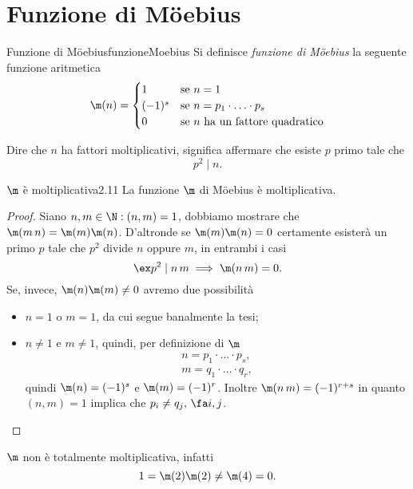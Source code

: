 \section{Funzione di M\"oebius}

\begin{defn}{Funzione di M\"oebius}{funzioneMoebius}
	Si definisce \emph{funzione di M\"oebius} la seguente funzione aritmetica
	\[
		\m(n)=
		\begin{cases}
			1      & \text{se }n=1                            \\
			(-1)^s & \text{se }n=p_1\cdot\ldots\cdot p_s      \\
			0      & \text{se \(n\) ha un fattore quadratico}
		\end{cases}
	\]
\end{defn}

\begin{oss}
	Dire che \(n\) ha fattori moltiplicativi, significa affermare che esiste \(p\) primo tale che
	\[
		p^2 \mid n.
	\]
\end{oss}

\begin{teor}{\(\m\) è moltiplicativa}{2.11}
	La funzione \(\m\) di M\"oebius è moltiplicativa.
\end{teor}

\begin{proof}
	Siano \(n,m \in \N:(n,m)=1\), dobbiamo mostrare che \(\m(m\,n)=\m(m) \m(n)\).
	D'altronde se \(\m(m)\m(n)=0\) certamente esisterà un primo \(p\) tale che \(p^2\) divide \(n\) oppure \(m\), in entrambi i casi
	\[
		\ex p^2 \mid n\,m \implies \m(n\,m)=0.
	\]
	Se, invece, \(\m(n)\m(m) \neq 0\) avremo due possibilità
	\begin{itemize}
		\item \(n=1\) o \(m=1\), da cui segue banalmente la tesi;
		\item \(n \neq 1\) e \(m \neq 1\), quindi, per definizione di \(\m\)
		      \begin{gather*}
			      n = p_1 \cdot\ldots\cdot p_s,\\
			      m = q_1 \cdot\ldots\cdot q_r,
		      \end{gather*}
		      quindi \(\m(n) = (-1)^s\) e \(\m(m) = (-1)^r\).
		      Inoltre \(\m(n\,m) = (-1)^{r+s}\) in quanto \((n,m)=1\) implica che \(p_i \neq q_j,\,\fa i,j\).
	\end{itemize}
\end{proof}

\begin{oss}
	\(\m\) non è totalmente moltiplicativa, infatti
	\[
		1 = \m(2)\m(2) \neq \m(4) = 0.
	\]
\end{oss}

